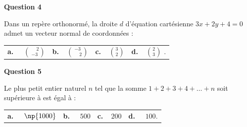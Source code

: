\medskip
\textbf{Question 4}
\medskip 

Dans un repère orthonormé, la droite $d$ d'équation cartésienne
$3 x + 2 y + 4 = 0$ admet un vecteur normal de coordonnées :

\medskip 
\begin{tabularx}{\linewidth}{*{4}{X}}
\textbf{a.~~} $\binom{\phantom{-}2}{-3}$ &\textbf{b.~~}$\binom{-3}{\phantom{-}2}$&\textbf{c.~~}$\binom{3}{2}$& \textbf{d.~~}$\binom{2}{3}$ .
\end{tabularx}

\medskip
\textbf{Question 5}
\medskip 

Le plus petit entier naturel $n$ tel que la somme $1 + 2 + 3 + 4 + \dots + n$ soit
supérieure à  est égal à :

\medskip 

\begin{tabularx}{\linewidth}{*{4}{X}}
\textbf{a.~~} $\np{1000} $ &\textbf{b.~~} $ 500 $&\textbf{c.~~}$ 200$& \textbf{d.~~} $100  $.
\end{tabularx}

\vspace{0,5cm}
